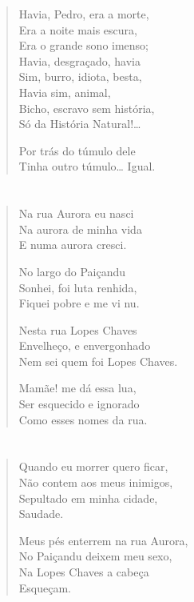 {\begin{verse}
Havia, Pedro, era a morte,\\
Era a noite mais escura,\\
Era o grande sono imenso;\\
Havia, desgraçado, havia\\
Sim, burro, idiota, besta,\\
Havia sim, animal,\\
Bicho, escravo sem história,\\
Só da História Natural!\ldots{}

Por trás do túmulo dele\\
Tinha outro túmulo\ldots{} Igual.
\end{verse}


\chapter*{}

\begin{verse}
Na rua Aurora eu nasci\\
Na aurora de minha vida\\
E numa aurora cresci.

No largo do Paiçandu\\
Sonhei, foi luta renhida,\\
Fiquei pobre e me vi nu.

Nesta rua Lopes Chaves\\
Envelheço, e envergonhado\\
Nem sei quem foi Lopes Chaves.

Mamãe! me dá essa lua,\\
Ser esquecido e ignorado\\
Como esses nomes da rua.
\end{verse}


\chapter*{}

\begin{verse}
Quando eu morrer quero ficar,\\
Não contem aos meus inimigos,\\
Sepultado em minha cidade,\\
\qquad\qquad Saudade.

Meus pés enterrem na rua Aurora,\\
No Paiçandu deixem meu sexo,\\
Na Lopes Chaves a cabeça\\
\qquad\qquad Esqueçam.


\end{verse}}
